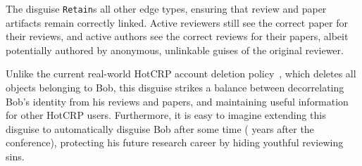 The disguise \texttt{Retain}s all other edge types, ensuring that review and paper
artifacts remain correctly linked. Active reviewers still see the correct paper for their reviews,
and active authors see the correct reviews for their papers, albeit potentially authored by
anonymous, unlinkable guises of the original reviewer.
%
%

%
Unlike the current real-world HotCRP account deletion policy~\cite{hotcrp:privacy}, which
deletes all objects belonging to Bob, this disguise strikes a balance between decorrelating
Bob's identity from his reviews and papers, and maintaining useful information for other
HotCRP users.
%
Furthermore, it is easy to imagine extending this disguise to automatically disguise Bob
after some time ( years after the conference), protecting his future research career
by hiding youthful reviewing sins.
\fi

